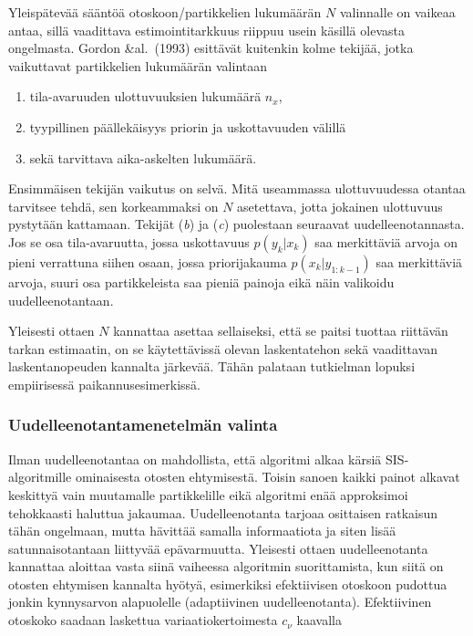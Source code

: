 \documentclass[
  12pt,
  a4paper, twoside]{book}
\providecommand{\tightlist}{%
  \setlength{\itemsep}{0pt}\setlength{\parskip}{0pt}}
\begin{document}
Yleispätevää sääntöä otoskoon/partikkelien lukumäärän \(N\) valinnalle on vaikeaa antaa, sillä vaadittava estimointitarkkuus riippuu usein käsillä olevasta ongelmasta. Gordon \&al.~(1993) esittävät kuitenkin kolme tekijää, jotka vaikuttavat partikkelien lukumäärän valintaan

\begin{enumerate}
\def\labelenumi{\alph{enumi}.}
\tightlist
\item
  tila-avaruuden ulottuvuuksien lukumäärä \({n_x}\),
\item
  tyypillinen päällekäisyys priorin ja uskottavuuden välillä
\item
  sekä tarvittava aika-askelten lukumäärä.
\end{enumerate}

Ensimmäisen tekijän vaikutus on selvä. Mitä useammassa ulottuvuudessa otantaa tarvitsee tehdä, sen korkeammaksi on \(N\) asetettava, jotta jokainen ulottuvuus pystytään kattamaan. Tekijät (\textit{b}) ja (\textit{c}) puolestaan seuraavat uudelleenotannasta. Jos se osa tila-avaruutta, jossa uskottavuus \(p(y_k|x_k)\) saa merkittäviä arvoja on pieni verrattuna siihen osaan, jossa priorijakauma \(p(x_k|y_{1:k-1})\) saa merkittäviä arvoja, suuri osa partikkeleista saa pieniä painoja eikä näin valikoidu uudelleenotantaan.

Yleisesti ottaen \(N\) kannattaa asettaa sellaiseksi, että se paitsi tuottaa riittävän tarkan estimaatin, on se käytettävissä olevan laskentatehon sekä vaadittavan laskentanopeuden kannalta järkevää. Tähän palataan tutkielman lopuksi empiirisessä paikannusesimerkissä.

\subsubsection{Uudelleenotantamenetelmän valinta}

Ilman uudelleenotantaa on mahdollista, että algoritmi alkaa kärsiä SIS-algoritmille ominaisesta otosten ehtymisestä. Toisin sanoen kaikki painot alkavat keskittyä vain muutamalle partikkelille eikä algoritmi enää approksimoi tehokkaasti haluttua jakaumaa. Uudelleenotanta tarjoaa osittaisen ratkaisun tähän ongelmaan, mutta hävittää samalla informaatiota ja siten lisää satunnaisotantaan liittyvää epävarmuutta. Yleisesti ottaen uudelleenotanta kannattaa aloittaa vasta siinä vaiheessa algoritmin suorittamista, kun siitä on otosten ehtymisen kannalta hyötyä, esimerkiksi efektiivisen otoskoon pudottua jonkin kynnysarvon alapuolelle (adaptiivinen uudelleenotanta). Efektiivinen otoskoko saadaan laskettua variaatiokertoimesta \(c_\nu\) kaavalla
\end{document}
